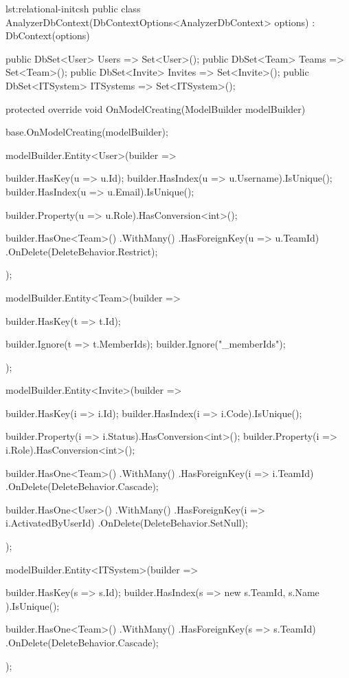\begin{listing}{lst:relational-init}{csh}
public class AnalyzerDbContext(DbContextOptions<AnalyzerDbContext> options) : DbContext(options)
{
    public DbSet<User> Users => Set<User>();
    public DbSet<Team> Teams => Set<Team>();
    public DbSet<Invite> Invites => Set<Invite>();
    public DbSet<ITSystem> ITSystems => Set<ITSystem>();

    protected override void OnModelCreating(ModelBuilder modelBuilder)
    {
        base.OnModelCreating(modelBuilder);

        modelBuilder.Entity<User>(builder =>
        {
            builder.HasKey(u => u.Id);
            builder.HasIndex(u => u.Username).IsUnique();
            builder.HasIndex(u => u.Email).IsUnique();

            builder.Property(u => u.Role).HasConversion<int>();

            builder.HasOne<Team>()
                   .WithMany()
                   .HasForeignKey(u => u.TeamId)
                   .OnDelete(DeleteBehavior.Restrict);
        });

        modelBuilder.Entity<Team>(builder =>
        {
            builder.HasKey(t => t.Id);

            builder.Ignore(t => t.MemberIds);
            builder.Ignore("_memberIds");
        });

        modelBuilder.Entity<Invite>(builder =>
        {
            builder.HasKey(i => i.Id);
            builder.HasIndex(i => i.Code).IsUnique();

            builder.Property(i => i.Status).HasConversion<int>();
            builder.Property(i => i.Role).HasConversion<int>();

            builder.HasOne<Team>()
                   .WithMany()
                   .HasForeignKey(i => i.TeamId)
                   .OnDelete(DeleteBehavior.Cascade);

            builder.HasOne<User>()
                   .WithMany()
                   .HasForeignKey(i => i.ActivatedByUserId)
                   .OnDelete(DeleteBehavior.SetNull);
        });

        modelBuilder.Entity<ITSystem>(builder =>
        {
            builder.HasKey(s => s.Id);
            builder.HasIndex(s => new { s.TeamId, s.Name }).IsUnique();

            builder.HasOne<Team>()
                   .WithMany()
                   .HasForeignKey(s => s.TeamId)
                   .OnDelete(DeleteBehavior.Cascade);
        });
    }
}
\end{listing}

